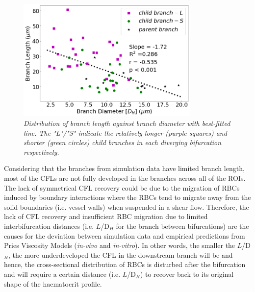 \begin{figure}[H]
\centering
\includegraphics[width=0.8\textwidth]{images/BranchLengthVSBranchDiameter.png}
\caption{\textit{Distribution of branch length against branch diameter with best-fitted line. The "L"/"S" indicate the relatively longer (purple squares) and shorter (green circles) child branches in each diverging bifurcation respectively.} \label{BranchLengthVSBranchDiamete}}
\end{figure}

\noindent Considering that the branches from simulation data have limited branch length, most of the CFLs are not fully developed in the branches across all of the ROIs. The lack of symmetrical CFL recovery could be due to the migration of RBCs induced by boundary interactions where the RBCs tend to migrate away from the solid boundaries (i.e. vessel walls) when suspended in a shear flow. Therefore, the lack of CFL recovery and insufficient RBC migration due to limited interbifurcation distances (i.e. $L$/D$_{H}$ for the branch between bifurcations) are the causes for the deviation between simulation data and empirical predictions from Pries Viscosity Models (\textit{in-vivo} and \textit{in-vitro}). In other words, the smaller the $L$/D$_{H}$, the more underdeveloped the CFL in the downstream branch will be and hence, the cross-sectional distribution of RBCs is disturbed after the bifurcation and will require a certain distance (i.e. $L$/D$_{H}$) to recover back to its original shape of the haematocrit profile. 
